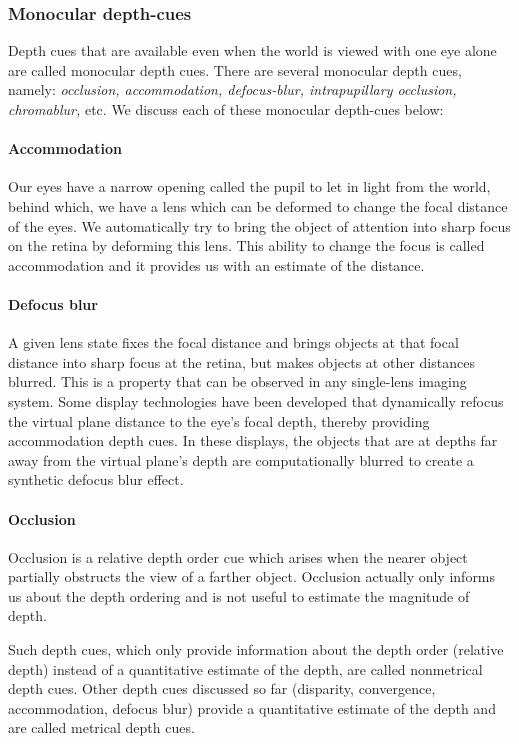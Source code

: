 \subsubsection{Monocular depth-cues}
\label{sec:background:monocular}
Depth cues that are available even when the world is viewed with one eye alone are called monocular depth cues. 
There are several monocular depth cues, namely: \emph{occlusion, accommodation, defocus-blur, intrapupillary occlusion, chromablur,} etc. 
We discuss each of these monocular depth-cues below: 

\paragraph{Accommodation} 
Our eyes have a narrow opening called the pupil to let in light from the world, behind which, we have a lens which can be deformed to change the focal distance of the eyes. 
We automatically try to bring the object of attention into sharp focus on the retina by deforming this lens.
This ability to change the focus is called accommodation and it provides us with an estimate of the distance. 

\paragraph{Defocus blur} A given lens state fixes the focal distance and brings objects at that focal distance into sharp focus at the retina, but makes objects at other distances blurred. 
This is a property that can be observed in any single-lens imaging system. 
Some display technologies have been developed that dynamically refocus the virtual plane distance to the eye's focal depth, thereby providing accommodation depth cues. 
In these displays, the objects that are at depths far away from the virtual plane's depth are computationally blurred to create a synthetic defocus blur effect. 
\paragraph{Occlusion} Occlusion is a relative depth order cue which arises when the nearer object partially obstructs the view of a farther object. 
Occlusion actually only informs us about the depth ordering and is not useful to estimate the magnitude of depth. 

Such depth cues, which only provide information about the depth order (relative depth) instead of a quantitative estimate of the depth, are called nonmetrical depth cues. 
Other depth cues discussed so far (disparity, convergence, accommodation, defocus blur) provide a quantitative estimate of the depth and are called metrical depth cues. 

